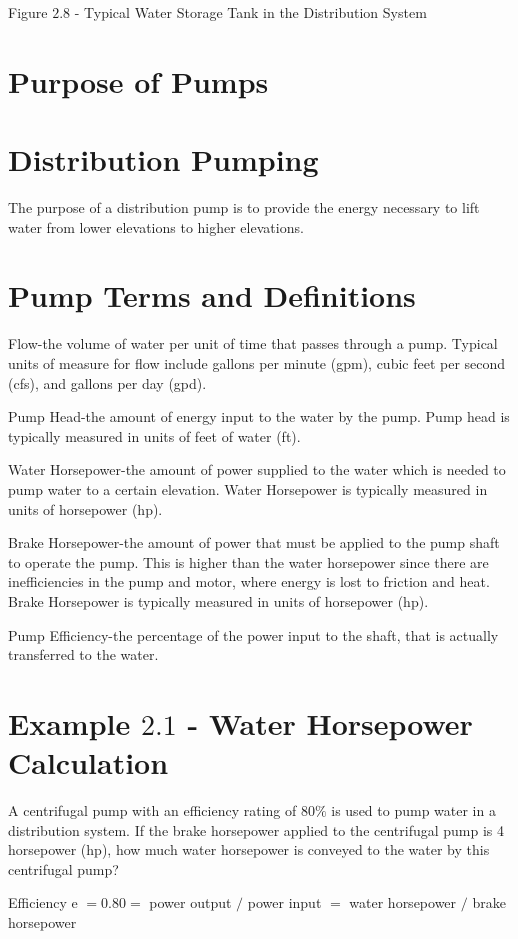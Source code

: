 \documentclass[10pt]{article}
\begin{document}
Figure $2.8$ - Typical Water Storage Tank in the Distribution System

\section{Purpose of Pumps}
\section{Distribution Pumping}
The purpose of a distribution pump is to provide the energy necessary to lift water from lower elevations to higher elevations.

\section{Pump Terms and Definitions}
Flow-the volume of water per unit of time that passes through a pump. Typical units of measure for flow include gallons per minute (gpm), cubic feet per second (cfs), and gallons per day (gpd).

Pump Head-the amount of energy input to the water by the pump. Pump head is typically measured in units of feet of water (ft).

Water Horsepower-the amount of power supplied to the water which is needed to pump water to a certain elevation. Water Horsepower is typically measured in units of horsepower (hp).

Brake Horsepower-the amount of power that must be applied to the pump shaft to operate the pump. This is higher than the water horsepower since there are inefficiencies in the pump and motor, where energy is lost to friction and heat. Brake Horsepower is typically measured in units of horsepower (hp).

Pump Efficiency-the percentage of the power input to the shaft, that is actually transferred to the water.

\section{Example $2.1$ - Water Horsepower Calculation}
A centrifugal pump with an efficiency rating of $80 \%$ is used to pump water in a distribution system. If the brake horsepower applied to the centrifugal pump is 4 horsepower (hp), how much water horsepower is conveyed to the water by this centrifugal pump?

Efficiency e $=0.80=$ power output $/$ power input $=$ water horsepower $/$ brake horsepower
\end{document}
